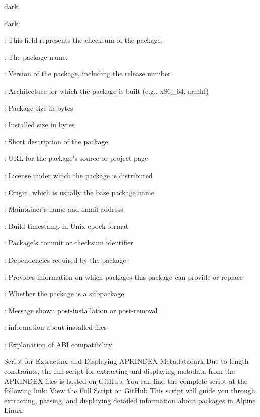 \begin{baseBoxThree}{}{dark}
    \smallskip
    \begin{baseBoxThree}{}{dark}
        \begin{posnexItemize}
            \item[\sA] : This field represents the checksum of the package.
            \item[\sA] : The package name.
            \item[\sA] : Version of the package, including the release number
            \item[\sA] : Architecture for which the package is built (e.g., x86\_64, armhf)
            \item[\sA] : Package size in bytes
            \item[\sA] : Installed size in bytes
            \item[\sA] : Short description of the package
            \item[\sA] : URL for the package's source or project page
            \item[\sA] : License under which the package is distributed
            \item[\sA] : Origin, which is usually the base package name
            \item[\sA] : Maintainer's name and email address
            \item[\sA] : Build timestamp in Unix epoch format
            \item[\sA] : Package's commit or checksum identifier
            \item[\sA] : Dependencies required by the package
            \item[\sA] : Provides information on which packages this package can provide or replace
            \item[\sA] : Whether the package is a subpackage
            \item[\sA] : Message shown post-installation or post-removal
            \item[\sA] : information about installed files
            \item[\sA] : Explanation of ABI compatibility            
        \end{posnexItemize}
    \end{baseBoxThree}
    \smallskip
    \begin{baseBoxThree}{Script for Extracting and Displaying APKINDEX Metadata}{dark}
        \smallskip
        Due to length constraints, the full script for extracting and displaying metadata from the APKINDEX files is hosted on GitHub. You can find the complete script at the following link:
        \href{https://github.com/Canine-Table/Alpine-Linux-Containers/blob/main/scripts/shell/apk-query.sh}{View the Full Script on GitHub}
        This script will guide you through extracting, parsing, and displaying detailed information about packages in Alpine Linux.
        \smallskip
    \end{baseBoxThree}
    \smallskip
\end{baseBoxThree}

